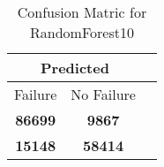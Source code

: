 \begin{table}[] 
\caption{Confusion Matric for RandomForest10} 
\label{Table: Prediction Accuracy-DMDRandomForest10OnlySunEKF-ignoreReflection100.9EKF-top2-Reflection} 
\centering 
\begin{tabular} 
 {@{}ccc@{}} 
\toprule 
\multicolumn{2}{c}{\textbf{Predicted}}
 \\ \midrule 
\multicolumn{1}{|c|}{Failure} & 
\multicolumn{1}{c|}{No Failure}
 \\ \midrule 
\multicolumn{1}{|c|}{\color{green}\textbf{86699}} & 
\multicolumn{1}{c|}{\color{red}\textbf{9867}}
 \\ \midrule 
\multicolumn{1}{|c|}{\color{red}\textbf{15148}} & 
\multicolumn{1}{c|}{\color{green}\textbf{58414}}
 \\ \bottomrule 
\end{tabular} 
\end{table} 

